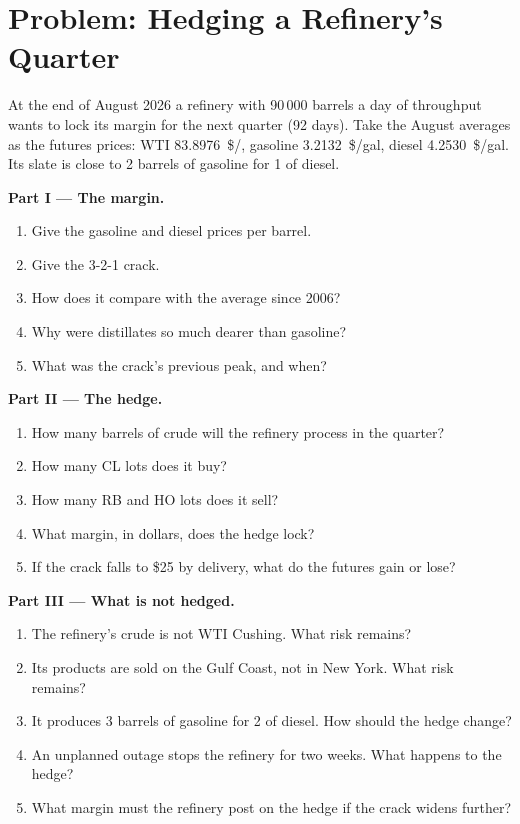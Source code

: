 \section{Problem: Hedging a Refinery's Quarter}

\begin{problem}\label{pb:m3:refined-products-and-cracks:1}
At the end of August 2026 a refinery with 90\,000 barrels a day of throughput wants
to lock its margin for the next quarter (92 days). Take the August averages as the
futures prices: WTI \qty{83.8976}{\$/\barrel}, gasoline \qty{3.2132}{\$/gal}, diesel
\qty{4.2530}{\$/gal}. Its slate is close to 2 barrels of gasoline for 1 of diesel.

\medskip\noindent\textbf{Part I --- The margin.}
\begin{enumerate}
\item Give the gasoline and diesel prices per barrel.
\item Give the 3-2-1 crack.
\item How does it compare with the average since 2006?
\item Why were distillates so much dearer than gasoline?
\item What was the crack's previous peak, and when?
\end{enumerate}

\medskip\noindent\textbf{Part II --- The hedge.}
\begin{enumerate}[resume]
\item How many barrels of crude will the refinery process in the quarter?
\item How many CL lots does it buy?
\item How many RB and HO lots does it sell?
\item What margin, in dollars, does the hedge lock?
\item If the crack falls to \$25 by delivery, what do the futures gain or lose?
\end{enumerate}

\medskip\noindent\textbf{Part III --- What is not hedged.}
\begin{enumerate}[resume]
\item The refinery's crude is not WTI Cushing. What risk remains?
\item Its products are sold on the Gulf Coast, not in New York. What risk remains?
\item It produces 3 barrels of gasoline for 2 of diesel. How should the hedge change?
\item An unplanned outage stops the refinery for two weeks. What happens to the hedge?
\item What margin must the refinery post on the hedge if the crack widens further?
\end{enumerate}


\end{problem}
